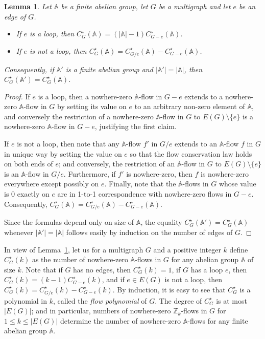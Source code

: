 \documentclass[12pt,twoside,openright,a4paper]{book}
\newtheorem{lemma}[theorem]{Lemma}
\begin{document}
\begin{lemma}\label{lemma:count}
Let $\mathbb{A}$ be a finite abelian group, let $G$ be a multigraph and let $e$ be an edge of $G$.
\begin{itemize}
\item If $e$ is a loop, then $C^\star_G(\mathbb{A})=(|\mathbb{A}|-1)C^\star_{G-e}(\mathbb{A})$.
\item If $e$ is not a loop, then $C^\star_G(\mathbb{A})=C^\star_{G/e}(\mathbb{A})-C^\star_{G-e}(\mathbb{A})$.
\end{itemize}
Consequently, if $\mathbb{A}'$ is a finite abelian group and $|\mathbb{A}'|=|\mathbb{A}|$, then
$C^\star_G(\mathbb{A}')=C^\star_G(\mathbb{A})$.
\end{lemma}
\begin{proof}
If $e$ is a loop, then a nowhere-zero $\mathbb{A}$-flow in $G-e$ extends to a nowhere-zero $\mathbb{A}$-flow in $G$
by setting its value on $e$ to an arbitrary non-zero element of $\mathbb{A}$, and conversely the restriction of
a nowhere-zero $\mathbb{A}$-flow in $G$ to $E(G)\setminus\{e\}$ is a nowhere-zero $\mathbb{A}$-flow in $G-e$, justifying
the first claim.

If $e$ is not a loop, then note that any $\mathbb{A}$-flow $f'$ in $G/e$ extends to an $\mathbb{A}$-flow $f$ in $G$ in unique way
by setting the value on $e$ so that the flow conservation law holds on both ends of $e$; and conversely, the restriction of an $\mathbb{A}$-flow in $G$
to $E(G)\setminus\{e\}$ is an $\mathbb{A}$-flow in $G/e$.  Furthermore, if $f'$ is nowhere-zero, then $f$ is nowhere-zero everywhere except possibly
on $e$.  Finally, note that the $\mathbb{A}$-flows in $G$ whose value is $0$ exactly on $e$ are in 1-to-1 correspondence with nowhere-zero flows in $G-e$.
Consequently, $C^\star_G(\mathbb{A})=C^\star_{G/e}(\mathbb{A})-C^\star_{G-e}(\mathbb{A})$.

Since the formulas depend only on size of $\mathbb{A}$, the equality $C^\star_G(\mathbb{A}')=C^\star_G(\mathbb{A})$ whenever $|\mathbb{A}'|=|\mathbb{A}|$ follows
easily by induction on the number of edges of $G$.
\end{proof}

In view of Lemma~\ref{lemma:count}, let us for a multigraph $G$ and a positive integer $k$ define
$C^\star_G(k)$ as the number of nowhere-zero $\mathbb{A}$-flows in $G$ for any abelian group $\mathbb{A}$ of size $k$.
Note that if $G$ has no edges, then $C^\star_G(k)=1$, if $G$ has a loop $e$, then $C^\star_G(k)=(k-1)C^\star_{G-e}(k)$,
and if $e\in E(G)$ is not a loop, then $C^\star_G(k)=C^\star_{G/e}(k)-C^\star_{G-e}(k)$.  By induction, it is easy to
see that $C^\star_G$ is a polynomial in $k$, called the \emph{flow polynomial} of $G$.  The degree of $C^\star_G$
is at most $|E(G)|$; and in particular, numbers of nowhere-zero $\mathbb{Z}_k$-flows in $G$ for $1\le k\le |E(G)|$
determine the number of nowhere-zero $\mathbb{A}$-flows for any finite abelian group $\mathbb{A}$.
\end{document}
